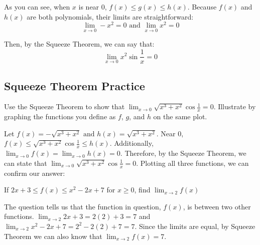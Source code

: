As you can see, when $x$ is near $0$, $f(x) \leq g(x) \leq h(x)$. Because $f(x)$ 
and $h(x)$ are both polynomials, their limits are straightforward: $$\lim_{x \to 
0}-x^2 = 0 \text{ and } \lim_{x \to 0}x^2 = 0$$

Then, by the Squeeze Theorem, we can say that: $$\lim_{x \to 0}x^2\sin{\frac{1}{x}}
=0$$

\subsection{Squeeze Theorem Practice}

\begin{Exercise}
[title=Squeeze Theorem 1, label=squeeze1]
    Use the Squeeze Theorem to show that $\lim_{x \to 0}\sqrt{x^3 + x^2}
    \cos{\frac{1}{x}} = 0$. Illustrate by graphing the functions you define as $f$, 
    $g$, and $h$ on the same plot.
    \vspace{100mm}
\end{Exercise}
\begin{Answer}
    [ref=squeeze1]
    Let $f(x) = -\sqrt{x^3+x^2} \text{ and } h(x) = \sqrt{x^3+x^2}$. Near $0$, $f(x) \leq \sqrt{x^3 + x^2}\cos{\frac{1}{x}} \leq h(x)$. Additionally, $\lim_{x \to 0}f(x) = \lim_{x \to 0}h(x) = 0$. Therefore, by the Squeeze Theorem, we can state that $\lim_{x \to 0}\sqrt{x^3 + x^2}\cos{\frac{1}{x}} = 0$. Plotting all three functions, we can confirm our answer:

\end{Answer}

\begin{Exercise}
    [title=Squeeze Theorem 2, label=squeeze2]
    If $2x+3 \leq f(x) \leq x^2-2x+7$ for $x \geq 0$, find $\lim_{x \to 2}f(x)$
    \vspace{40mm}
\end{Exercise}
\begin{Answer}
    [ref=squeeze2]
    The question tells us that the function in question, $f(x)$, is between two other functions. $\lim_{x \to 2}2x+3 = 2(2)+3 = 7$ and $\lim_{x \to 2}x^2-2x+7 = 2^2-2(2)+7=7$. Since the limits are equal, by Squeeze Theorem we can also know that $\lim_{x \to 2}f(x) = 7$.
\end{Answer}

